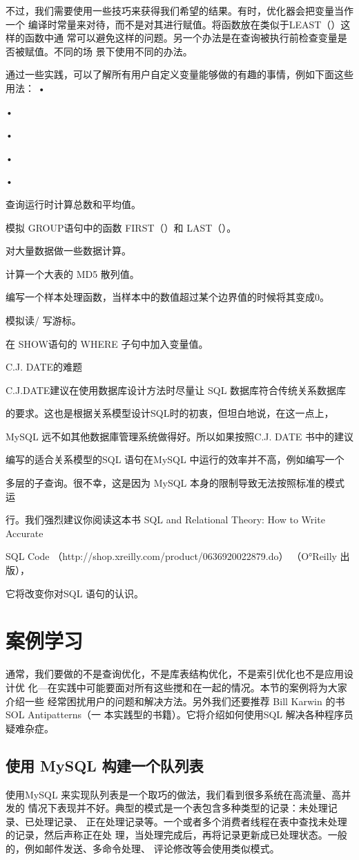 不过，我们需要使用一些技巧来获得我们希望的结果。有时，优化器会把变量当作一个
编译时常量来对待，而不是对其进行赋值。将函数放在类似于LEAST（）这样的函数中通
常可以避免这样的问题。另一个办法是在查询被执行前检查变量是否被赋值。不同的场
景下使用不同的办法。

通过一些实践，可以了解所有用户自定义变量能够做的有趣的事情，例如下面这些用法：
•

•

•

•

•

查询运行时计算总数和平均值。

模拟 GROUP语句中的函数 FIRST（）和 LAST（）。

对大量数据做一些数据计算。

计算一个大表的 MD5 散列值。

编写一个样本处理函数，当样本中的数值超过某个边界值的时候将其变成0。

模拟读/ 写游标。

在 SHOW语句的 WHERE 子句中加入变量值。

C.J. DATE的难题

C.J.DATE建议在使用数据库设计方法时尽量让 SQL 数据库符合传统关系数据库

的要求。这也是根据关系模型设计SQL时的初衷，但坦白地说，在这一点上，

MySQL 远不如其他数据庫管理系统做得好。所以如果按照C.J. DATE 书中的建议

编写的适合关系模型的SQL 语句在MySQL 中运行的效率并不高，例如编写一个

多层的子查询。很不幸，这是因为 MySQL 本身的限制导致无法按照标准的模式运

行。我们强烈建议你阅读这本书 SQL and Relational Theory: How to Write Accurate

SQL Code （http://shop.xreilly.com/product/0636920022879.do） （O°Reilly 出版），

它将改变你对SQL 语句的认识。

\section{案例学习}
通常，我们要做的不是查询优化，不是库表结构优化，不是索引优化也不是应用设计优
化—在实践中可能要面对所有这些搅和在一起的情况。本节的案例将为大家介绍一些
经常困扰用户的问题和解决方法。另外我们还要推荐 Bill Karwin 的书SOL Antipatterns（一
本实践型的书籍）。它将介绍如何使用SQL 解决各种程序员疑难杂症。

\subsection{使用 MySQL 构建一个队列表}
使用MySQL 来实现队列表是一个取巧的做法，我们看到很多系统在高流量、高并发的
情况下表现并不好。典型的模式是一个表包含多种类型的记录：未处理记录、已处理记录、
正在处理记录等。一个或者多个消费者线程在表中查找未处理的记录，然后声称正在处
理，当处理完成后，再将记录更新成已处理状态。一般的，例如邮件发送、多命令处理、
评论修改等会使用类似模式。

